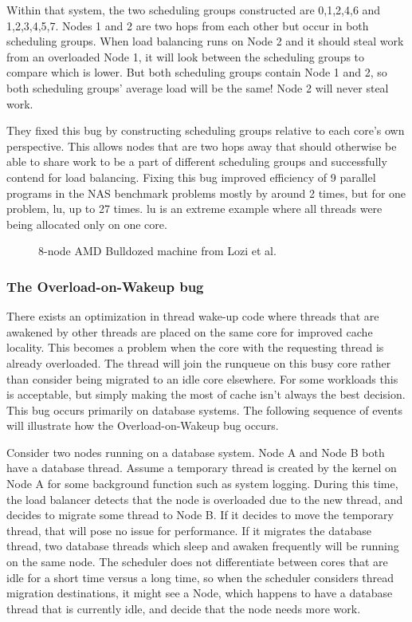 \documentclass{sig-alternate}
\begin{document}
Within that system, the two scheduling groups constructed are {0,1,2,4,6} and {1,2,3,4,5,7}. Nodes 1 and 2 are two hops from each other but occur in both scheduling groups. When load balancing runs on Node 2 and it should steal work from an overloaded Node 1, it will look between the scheduling groups to compare which is lower. But both scheduling groups contain Node 1 and 2, so both scheduling groups' average load will be the same! Node 2 will never steal work.~\cite{Lozi:2016}

They fixed this bug by constructing scheduling groups relative to each core's own perspective. This allows nodes that are two hops away that should otherwise be able to share work to be a part of different scheduling groups and successfully contend for load balancing. Fixing this bug improved efficiency of 9 parallel programs in the NAS benchmark problems mostly by around 2 times, but for one problem, lu, up to 27 times. lu is an extreme example where all threads were being allocated only on one core.~\cite{Lozi:2016}

\begin{figure}
\centering
{}
\caption{8-node AMD Bulldozed machine from Lozi et al.~\cite{Lozi:2016}}
\label{fig:cfs_schedgroups}
\end{figure}

\subsubsection{The Overload-on-Wakeup bug}
\label{sec:cfsfault_overload}


There exists an optimization in thread wake-up code where threads that are awakened by other threads are placed on the same core for improved cache locality. This becomes a problem when the core with the requesting thread is already overloaded. The thread will join the runqueue on this busy core rather than consider being migrated to an idle core elsewhere. For some workloads this is acceptable, but simply making the most of cache isn't always the best decision. This bug occurs primarily on database systems. The following sequence of events will illustrate how the Overload-on-Wakeup bug occurs.~\cite{Lozi:2016}

Consider two nodes running on a database system. Node A and Node B both have a database thread. Assume a temporary thread is created by the kernel on Node A for some background function such as system logging. During this time, the load balancer detects that the node is overloaded due to the new thread, and decides to migrate some thread to Node B. If it decides to move the temporary thread, that will pose no issue for performance. If it migrates the database thread, two database threads which sleep and awaken frequently will be running on the same node. The scheduler does not differentiate between cores that are idle for a short time versus a long time, so when the scheduler considers thread migration destinations, it might see a Node, which happens to have a database thread that is currently idle, and decide that the node needs more work.~\cite{Lozi:2016}
\end{document}
